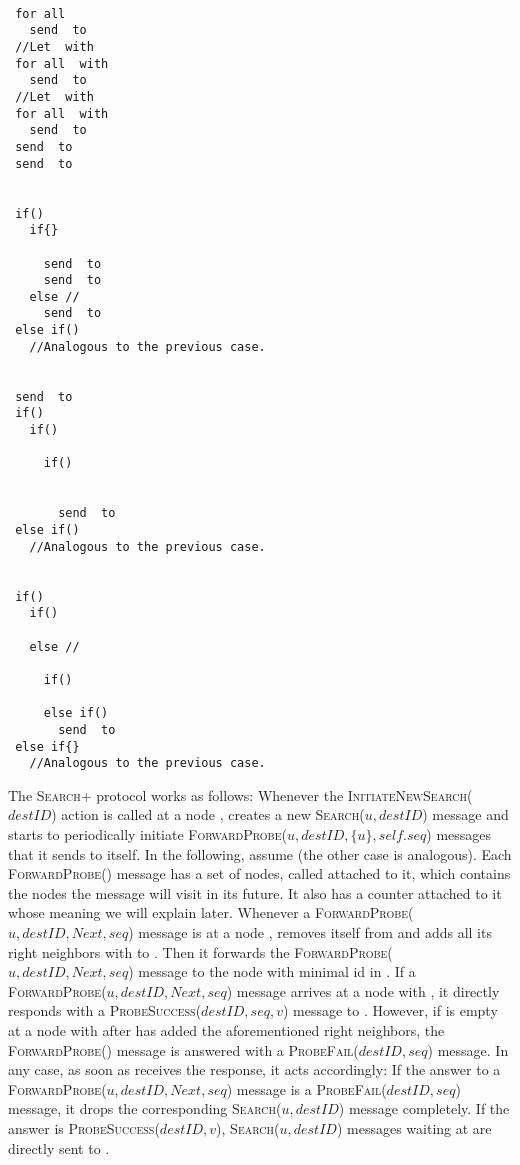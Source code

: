 \documentclass[a4paper,USenglish]{lipics}
\newcommand{\blp}{\textsc{Build-List+}\xspace}
\newcommand{\srp}{\textsc{Search+}\xspace}
\newcommand{\search}[1]{\textsc{Search(\ensuremath{#1})}\xspace}
\newcommand{\initsearch}[1]{\textsc{InitiateNewSearch(\ensuremath{#1})}\xspace}
\newcommand{\forwardprobe}[1]{\textsc{ForwardProbe(\ensuremath{#1})}\xspace}
\newcommand{\psuccess}[1]{\textsc{ProbeSuccess(\ensuremath{#1})}\xspace}
\newcommand{\pfail}[1]{\textsc{ProbeFail(\ensuremath{#1})}\xspace}
\begin{document}
\begin{lstlisting}[mathescape=true,float=*,caption=\blp protocol,label=algo:blp]

 for all 
   send  to 
 //Let  with  
 for all  with 
   send  to 
 //Let  with     
 for all  with 
   send  to 
 send  to 
 send  to 

 
 if()
   if{}
     
     send  to 
     send  to 
   else //
     send  to 
 else if() 
   //Analogous to the previous case.
    

 send  to 
 if()
   if()
     
     if()
       
       
       send  to 
 else if() 
   //Analogous to the previous case. 
 

 if()
   if()
      
   else //
     
     if()
       
     else if()
       send  to 
 else if{} 
   //Analogous to the previous case. 

\end{lstlisting}


The \srp protocol works as follows:
Whenever the \initsearch{destID} action is called at a node ,  creates a new \search{u,destID} message and starts to periodically initiate \forwardprobe{u,destID, \{u\}, self.seq} messages that it sends to itself. 
In the following, assume  (the other case is analogous).
Each \forwardprobe{} message has a set of nodes, called  attached to it, which contains the nodes the message will visit in its future. 
It also has a counter  attached to it whose meaning we will explain later.
Whenever a \forwardprobe{u,destID, Next, seq} message is at a node ,  removes itself from  and adds all its right neighbors  with  to . 
Then it forwards the \forwardprobe{u,destID, Next, seq} message to the node with minimal id in .
If a \forwardprobe{u,destID, Next, seq} message arrives at a node  with , it directly responds with a \psuccess{destID,seq, v} message to .
However, if  is empty at a node  with  after  has added the aforementioned right neighbors, the \forwardprobe{} message is answered with a \pfail{destID,seq} message.
In any case, as soon as  receives the response, it acts accordingly: If the answer to a \forwardprobe{u,destID,Next,seq} message is a \pfail{destID,seq} message, it drops the corresponding \search{u,destID} message completely.
If the answer is \psuccess{destID,v}, \search{u,destID} messages waiting at  are directly sent to .
\end{document}
